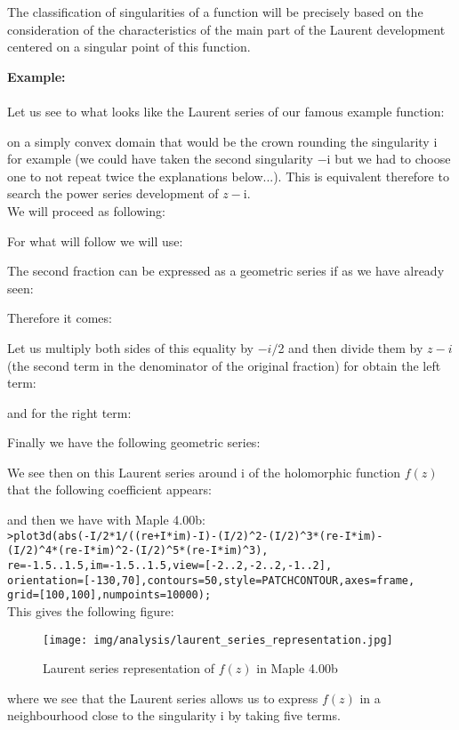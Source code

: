 	The classification of singularities of a function will be precisely based on the consideration of the characteristics of the main part of the Laurent  development centered on a singular point of this function.
	\begin{tcolorbox}[colframe=black,colback=white,sharp corners,breakable]
	\textbf{{\Large {}}Example:}\\\\
	Let us see to what looks like the Laurent series of our famous example function:
	
	on a simply convex domain that would be the crown rounding the singularity $\mathrm{i}$ for example (we could have taken the second singularity $-\mathrm{i}$ but we had to choose one to not repeat twice the explanations below...). This is equivalent therefore to search the power series development of $z-\mathrm{i}$. \\
	
	We will proceed as following:
	
	For what will follow we will use:
	
	The second fraction can be expressed as a geometric series if as we have already seen:
	
	Therefore it comes:
	
	Let us multiply both sides of this equality by $-i / $2 and then divide them by $z - i$ (the second term in the denominator of the original fraction) for obtain the left term:
	
	and for the right term:
	
	Finally we have the following geometric series:
	
	We see then on this Laurent series around $\mathrm{i}$ of the holomorphic function $f(z)$ that the following coefficient appears:
	
	and then we have with Maple 4.00b:\\
	
	\texttt{>plot3d(abs(-I/2*1/((re+I*im)-I)-(I/2)\string^2-(I/2)\string^3*(re-I*im)-\\
	(I/2)\string^4*(re-I*im)\string^2-(I/2)\string^5*(re-I*im)\string^3),\\
	re=-1.5..1.5,im=-1.5..1.5,view=[-2..2,-2..2,-1..2],\\
	orientation=[-130,70],contours=50,style=PATCHCONTOUR,axes=frame,\\
	grid=[100,100],numpoints=10000);}\\
	
	This gives the following figure:
	\begin{figure}[H]
		\centering
		\texttt{[image: img/analysis/laurent\_series\_representation.jpg]}
		\caption{Laurent series representation of $f(z)$ in Maple 4.00b}
	\end{figure}
	where we see that the Laurent series allows us to express $f (z)$ in a neighbourhood close to the singularity $\mathrm{i}$ by taking five terms.\\
	

\end{tcolorbox}
